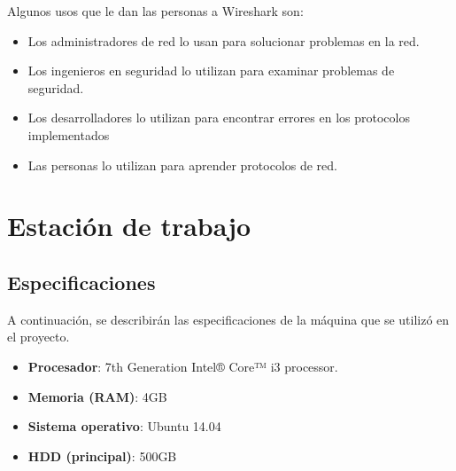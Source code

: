 Algunos usos que le dan las personas a Wireshark son:

\begin{itemize}
\item Los administradores de red lo usan para solucionar problemas en la red.
\item Los ingenieros en seguridad lo utilizan para examinar problemas de seguridad.
\item Los desarrolladores lo utilizan para encontrar errores en los protocolos implementados
\item Las personas lo utilizan para aprender protocolos de red.
\end{itemize}

\section{Estación de trabajo}

\subsection{Especificaciones}
A continuación, se describirán las especificaciones de la máquina que se utilizó en el proyecto.

\begin{itemize}
\item \textbf{Procesador}: 7th Generation Intel® Core™ i3 processor.
\item \textbf{Memoria (RAM)}: 4GB
\item \textbf{Sistema operativo}: Ubuntu 14.04
\item \textbf{HDD (principal)}: 500GB
\end{itemize}

